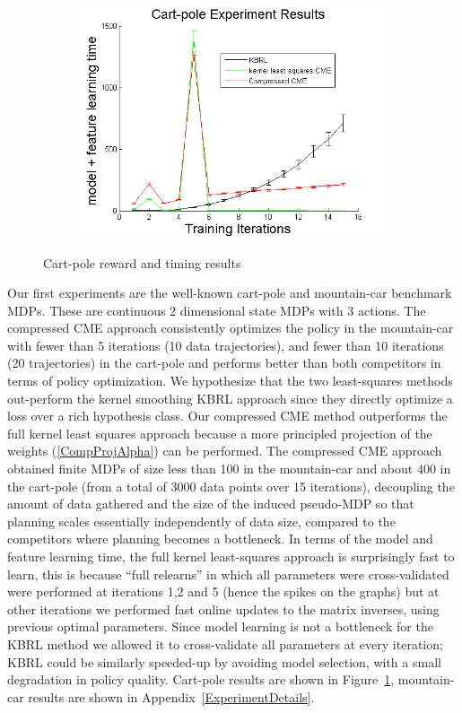 \documentclass[letterpaper]{article}
\begin{document}
\begin{figure}[htb]
\begin{subfigure}[b]{0.3\textwidth}
\includegraphics[width=\textwidth]{CPmodelfeature.png}
\end{subfigure}
\caption{Cart-pole reward and timing results}
  \label{CPfigs}
\end{figure}

Our first experiments are the well-known cart-pole and mountain-car benchmark MDPs. These are continuous 2 dimensional state MDPs with 3 actions. The compressed CME approach consistently optimizes the policy in the mountain-car with fewer than 5 iterations (10 data trajectories), and fewer than 10 iterations (20 trajectories) in the cart-pole and performs better than both competitors in terms of policy optimization. We hypothesize that the two least-squares methods out-perform the kernel smoothing KBRL approach since they directly optimize a loss over a rich hypothesis class. Our compressed CME method outperforms the full kernel least squares approach because a more principled projection of the weights (\ref{CompProjAlpha}) can be performed. The compressed CME approach obtained finite MDPs of size less than 100 in the mountain-car and about 400 in the cart-pole (from a total of 3000 data points over 15 iterations), decoupling the amount of data gathered and the size of the induced pseudo-MDP so that planning scales essentially independently of data size, compared to the competitors where planning becomes a bottleneck. In terms of the model and feature learning time, the full kernel least-squares approach is surprisingly fast to learn, this is because ``full relearns'' in which all parameters were cross-validated were performed at iterations 1,2 and 5 (hence the spikes on the graphs) but at other iterations we performed fast online updates to the matrix inverses, using previous optimal parameters. Since model learning is not a bottleneck for the KBRL method we allowed it to cross-validate all parameters at every iteration; KBRL could be similarly speeded-up by avoiding model selection, with a small degradation in policy quality. Cart-pole results are shown in Figure~\ref{CPfigs}, mountain-car results are shown in Appendix~\ref{ExperimentDetails}.
\end{document}
